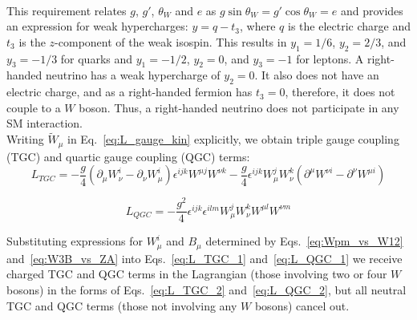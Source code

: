 \\

This requirement relates $g$, $g'$, $\theta_W$ and $e$ as $g \sin \theta_W = g' \cos \theta_W = e$ and provides an expression for weak hypercharges: $y = q - t_3$, where $q$ is the electric charge and $t_3$ is the $z$-component of the weak isospin. This results in $y_1=1/6$, $y_2=2/3$, and $y_3=-1/3$ for quarks and $y_1=-1/2$, $y_2=0$, and $y_3=-1$ for leptons. A right-handed neutrino has a weak hypercharge of $y_2=0$. It also does not have an electric charge, and as a right-handed fermion has $t_3=0$, therefore, it does not couple to a $W$ boson. Thus, a right-handed neutrino does not participate in any SM interaction.\\

Writing $\tilde{W}_\mu$ in Eq.~\ref{eq:L_gauge_kin} explicitly, we obtain triple gauge coupling (TGC) and quartic gauge coupling (QGC) terms:\\ 

\begin{equation} \label{eq:L_TGC_1}
L_{TGC} = -\frac{g}{4}(\partial_\mu W_\nu^i - \partial_\nu W_\mu^i)\epsilon^{ijk}W^{\mu j}W^{\nu k} - \frac{g}{4}\epsilon^{ijk}W_\mu^j W_\nu^k (\partial^\mu W^{\nu i} - \partial^\nu W^{\mu i})
\end{equation}

\begin{equation} \label{eq:L_QGC_1}
L_{QGC} = -\frac{g^2}{4} \epsilon^{ijk} \epsilon^{ilm} W_\mu^j W_\nu^k W^{\mu l} W^{\nu m}
\end{equation}

Substituting expressions for $W_\mu^i$ and $B_\mu$ determined by Eqs.~\ref{eq:Wpm_vs_W12} and~\ref{eq:W3B_vs_ZA} into Eqs.~\ref{eq:L_TGC_1} and~\ref{eq:L_QGC_1} we receive charged TGC and QGC terms in the Lagrangian (those involving two or four $W$ bosons) in the forms of Eqs.~\ref{eq:L_TGC_2} and~\ref{eq:L_QGC_2}, but all neutral TGC and QGC terms (those not involving any $W$ bosons) cancel out.


